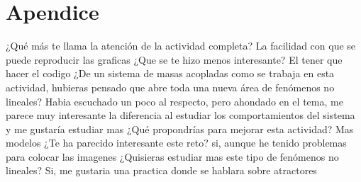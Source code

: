 \documentclass{article}
\begin{document}
\section{Apendice}
¿Qué más te llama la atención de la actividad completa?
\newline
La facilidad con que se puede reproducir las graficas
\newline
¿Que se te hizo menos interesante?
\newline
El tener que hacer el codigo
\newline
¿De un sistema de masas acopladas como se trabaja en esta actividad, hubieras pensado que abre toda una nueva área de fenómenos no lineales?
\newline
Habia escuchado un poco al respecto, pero ahondado en el tema, me parece muy interesante la diferencia al estudiar los comportamientos del sistema y me gustaría estudiar mas
\newline
¿Qué propondrías para mejorar esta actividad?
\newline
Mas modelos
\newline
¿Te ha parecido interesante este reto?
\newline
si, aunque he tenido problemas para colocar las imagenes
\newline
¿Quisieras estudiar mas este tipo de fenómenos no lineales?
\newline
Si, me gustaria una practica donde se hablara sobre atractores
\end{document}
